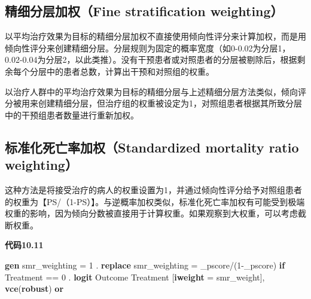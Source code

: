 \documentclass[
  chinese-hans,
  letterpaper,
  DIV=11,
  numbers=noendperiod]{scrreprt}
\newenvironment{Shaded}{\begin{snugshade}}{\end{snugshade}}
\newcommand{\KeywordTok}[1]{\textcolor[rgb]{0.00,0.23,0.31}{\textbf{#1}}}
\newcommand{\NormalTok}[1]{\textcolor[rgb]{0.00,0.23,0.31}{#1}}
\begin{document}
\subsection{精细分层加权（Fine stratification
weighting）}\label{ux7cbeux7ec6ux5206ux5c42ux52a0ux6743fine-stratification-weighting}

以平均治疗效果为目标的精细分层加权不直接使用倾向性评分来计算加权，而是用倾向性评分来创建精细分层。分层规则为固定的概率宽度（如0-0.02为分层1，0.02-0.04为分层2，以此类推）。没有干预患者或对照患者的分层被剔除后，根据剩余每个分层中的患者总数，计算出干预和对照组的权重。

以治疗人群中的平均治疗效果为目标的精细分层与上述精细分层方法类似，倾向评分被用来创建精细分层，但治疗组的权重被设定为1，对照组患者根据其所致分层中的干预组患者数量进行重新加权。

\subsection{标准化死亡率加权（Standardized mortality ratio
weighting）}\label{ux6807ux51c6ux5316ux6b7bux4ea1ux7387ux52a0ux6743standardized-mortality-ratio-weighting}

这种方法是将接受治疗的病人的权重设置为1，并通过倾向性评分给予对照组患者的权重为【PS/（1-PS）】。与逆概率加权类似，标准化死亡率加权有可能受到极端权重的影响，因为倾向分数被直接用于计算权重。如果观察到大权重，可以考虑截断权重。

\begin{tcolorbox}[enhanced jigsaw, arc=.35mm, bottomrule=.15mm, breakable, colback=white, colframe=quarto-callout-note-color-frame, left=2mm, leftrule=.75mm, opacityback=0, rightrule=.15mm, toprule=.15mm]

\vspace{-3mm}\textbf{代码10.11}\vspace{3mm}

\begin{Shaded}
\begin{Highlighting}[]
\KeywordTok{gen}\NormalTok{ smr\_weighting = 1}
\NormalTok{. }\KeywordTok{replace}\NormalTok{ smr\_weighting = \_pscore/(1{-}\_pscore) }\KeywordTok{if}\NormalTok{ Treatment == 0}
\NormalTok{. }\KeywordTok{logit}\NormalTok{ Outcome Treatment [}\KeywordTok{iweight}\NormalTok{ = smr\_weight], }\KeywordTok{vce}\NormalTok{(}\KeywordTok{robust}\NormalTok{) }\KeywordTok{or}
\end{Highlighting}
\end{Shaded}

\end{tcolorbox}
\end{document}
